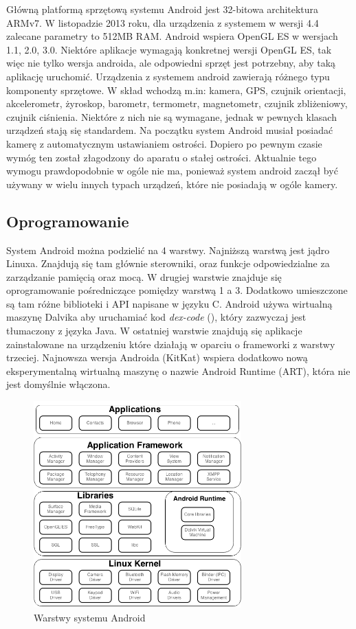 Główną platformą sprzętową systemu Android jest 32-bitowa architektura ARMv7. W listopadzie 2013 roku, dla urządzenia z systemem w wersji 4.4 zalecane parametry to 512MB RAM. \cite{android:50} Android wspiera OpenGL ES w wersjach 1.1, 2.0, 3.0. Niektóre aplikacje wymagają konkretnej wersji OpenGL ES, tak więc nie tylko wersja androida, ale odpowiedni sprzęt jest potrzebny, aby taką aplikację uruchomić.\cite{android:51} Urządzenia z systemem android zawierają różnego typu komponenty sprzętowe. W skład wchodzą m.in: kamera, GPS, czujnik orientacji, akcelerometr, żyroskop, barometr, termometr, magnetometr, czujnik zbliżeniowy, czujnik ciśnienia. Niektóre z nich nie są wymagane, jednak w pewnych klasach urządzeń stają się standardem. Na początku system Android musiał posiadać kamerę z automatycznym ustawianiem ostrości. Dopiero po pewnym czasie wymóg ten został złagodzony do aparatu o stałej ostrości.\cite{android:52} Aktualnie tego wymogu prawdopodobnie w ogóle nie ma, ponieważ system android zaczął być używany w wielu innych typach urządzeń, które nie posiadają w ogóle kamery.

\subsection{Oprogramowanie}

System Android można podzielić na 4 warstwy. Najniższą warstwą jest jądro Linuxa. Znajdują się tam głównie sterowniki, oraz funkcje odpowiedzialne za zarządzanie pamięcią oraz mocą. W drugiej warstwie znajduje się oprogramowanie pośredniczące pomiędzy warstwą 1 a 3. Dodatkowo umieszczone są tam różne biblioteki i API napisane w języku C. Android używa wirtualną maszynę Dalvika aby uruchamiać kod \emph{dex-code} (), który zazwyczaj jest tłumaczony z języka Java.\cite{android:61}\cite{android:62} W ostatniej warstwie znajdują się aplikacje zainstalowane na urządzeniu które działają w oparciu o frameworki z warstwy trzeciej. Najnowsza wersja Androida (KitKat) wspiera dodatkowo nową eksperymentalną wirtualną maszynę o nazwie Android Runtime (ART), która nie jest domyślnie włączona.\cite{android:63}

\begin{figure}[H] 
\centering\includegraphics[width=8cm]{figures/android/stack}
\caption{Warstwy systemu Android}
\end{figure}


